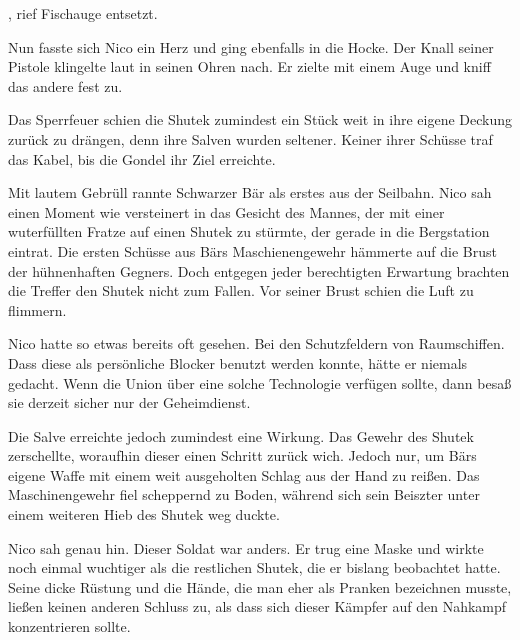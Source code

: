 \par

, rief Fischauge entsetzt.

\par

Nun fasste sich Nico ein Herz und ging ebenfalls in die Hocke. Der Knall seiner Pistole klingelte laut in seinen Ohren nach. Er zielte mit einem Auge und kniff das andere fest zu.

\par

Das Sperrfeuer schien die Shutek zumindest ein Stück weit in ihre eigene Deckung zurück zu drängen, denn ihre Salven wurden seltener. Keiner ihrer Schüsse traf das Kabel, bis die Gondel ihr Ziel erreichte.

\par

Mit lautem Gebrüll rannte Schwarzer Bär als erstes aus der Seilbahn. Nico sah einen Moment wie versteinert in das Gesicht des Mannes, der mit einer wuterfüllten Fratze auf einen Shutek zu stürmte, der gerade in die Bergstation eintrat. Die ersten Schüsse aus Bärs Maschienengewehr hämmerte auf die Brust der hühnenhaften Gegners. Doch entgegen jeder berechtigten Erwartung brachten die Treffer den Shutek nicht zum Fallen. Vor seiner Brust schien die Luft zu flimmern.

\par

Nico hatte so etwas bereits oft gesehen. Bei den Schutzfeldern von Raumschiffen. Dass diese als persönliche Blocker benutzt werden konnte, hätte er niemals gedacht. Wenn die Union über eine solche Technologie verfügen sollte, dann besaß sie derzeit sicher nur der Geheimdienst.

\par

Die Salve erreichte jedoch zumindest eine Wirkung. Das Gewehr des Shutek zerschellte, woraufhin dieser einen Schritt zurück wich. Jedoch nur, um Bärs eigene Waffe mit einem weit ausgeholten Schlag aus der Hand zu reißen. Das Maschinengewehr fiel scheppernd zu Boden, während sich sein Beiszter unter einem weiteren Hieb des Shutek weg duckte.

\par

Nico sah genau hin. Dieser Soldat war anders. Er trug eine Maske und wirkte noch einmal wuchtiger als die restlichen Shutek, die er bislang beobachtet hatte. Seine dicke Rüstung und die Hände, die man eher als Pranken bezeichnen musste, ließen keinen anderen Schluss zu, als dass sich dieser Kämpfer auf den Nahkampf konzentrieren sollte.

